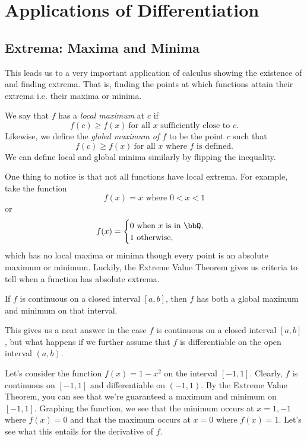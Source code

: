 \section{Applications of Differentiation}

\subsection{Extrema: Maxima and Minima}

This leads us to a very important application of calculus showing the existence of and finding extrema. That is, finding the points at which functions attain their extrema i.e. their maxima or minima.

\begin{defn}
  We say that $f$ has a \emph{local maximum} at $c$ if
  \[
f(c)\geq f(x)\ \text{for all }x\text{ sufficiently close to } c.
  \]
Likewise, we define the \emph{global maximum of $f$} to be the point $c$ such that
\[
f(c)\geq f(x)\ \text{for all }x\text{ where $f$ is defined.}
\]
We can define local and global minima similarly by flipping the inequality.
\end{defn}

One thing to notice is that not all functions have local extrema. For example, take the function
\[
f(x)=x \text{ where } 0<x<1
\] or
\[
f(x)= \begin{cases}
0 \text{ when $x$ is in } \bbQ,  \\
1 \text{ otherwise},
\end{cases}
\] which has no local maxima or minima though every point is an absolute maximum or minimum. Luckily, the Extreme Value Theorem gives us criteria to tell when a function has absolute extrema.

\begin{thm}
  If $f$ is continuous on a closed interval $[a,b]$, then $f$ has both a global maximum and minimum on that interval.
\end{thm}

This gives us a neat answer in the case $f$ is continuous on a closed interval $[a,b]$, but what happens if we further assume that $f$ is differentiable on the open interval $(a,b)$.


Let's consider the function $f(x)=1-x^2$ on the interval $[-1,1]$. Clearly, $f$ is continuous on $[-1,1]$ and differentiable on $(-1,1)$. By the Extreme Value Theorem, you can see that we're guaranteed a maximum and minimum on $[-1,1]$. Graphing the function, we see that the minimum occurs at $x=1,-1$ where $f(x)=0$ and that the maximum occurs at $x=0$ where $f(x)=1$. Let's see what this entails for the derivative of $f$. \\


